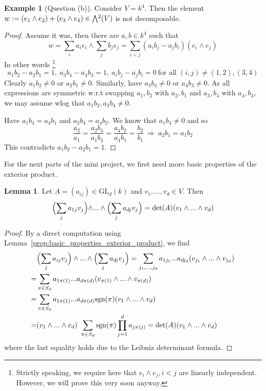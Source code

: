 \documentclass{scrartcl}
\newcommand{\GL}{\mathrm{GL}}
\newcommand{\sgn}{\mathrm{sgn}}
\newcommand{\extpow}{\mathchoice{{\textstyle\bigwedge}}
    {{\bigwedge}}
    {{\textstyle\wedge}}
    {{\scriptstyle\wedge}}}
\theoremstyle{definition}
\newtheorem{lemma}[subsection]{Lemma}
\newtheorem{example}[subsection]{Example}
\begin{document}
\begin{example}[Question (b)]
    Consider $V = k^4$. 
    Then the element $w := (e_1 \wedge e_2) + (e_3 \wedge e_4) \in \extpow^2(V)$ is not decomposable. 
\end{example}
\begin{proof}
    Assume it was, then there are $a, b \in k^4$ such that
    \begin{equation*}
        w = \sum_i a_i e_i \wedge \sum_j b_j e_j = \sum_{i < j} (a_i b_j - a_j b_i) (e_i \wedge e_j)
    \end{equation*}
    In other words
    \footnote{Strictly speaking, we require here that $e_i \wedge e_j, i < j$ are linearly independent. However, we will prove this very soon anyway.}
    \begin{equation*}
        a_1b_2 - a_2b_1 = 1, \ a_3b_4 - a_4b_3 = 1, \ a_i b_j - a_j b_i = 0 \ \text{for all $(i, j) \neq (1, 2), (3, 4)$}
    \end{equation*}
    Clearly $a_1 b_2 \neq 0$ or $a_2 b_1 \neq 0$.
    Similarly, have $a_3 b_4 \neq 0$ or $a_4 b_3 \neq 0$.
    As all expressions are symmetric w.r.t swapping $a_1, b_2$ with $a_2, b_1$ and $a_3, b_4$ with $a_4, b_3$, we may assume wlog that $a_1 b_2, a_3 b_4 \neq 0$.

    Have $a_1 b_4 = a_4 b_1$ and $a_2 b_4 = a_4 b_2$.
    We know that $a_1 b_4 \neq 0$ and so
    \begin{equation*}
        \frac {a_2} {a_1} = \frac {a_2 b_4} {a_1 b_4} = \frac {a_4 b_2} {a_4 b_1} = \frac {b_2} {b_1} \ \Rightarrow \ a_2 b_1 = a_1 b_2
    \end{equation*}
    This contradicts $a_1 b_2 - a_2 b_1 = 1$.
\end{proof}
For the next parts of the mini project, we first need more basic properties of the exterior product.
\begin{lemma}
    \label{prop:linear_transform_extpow}
    Let $A = (a_{ij}) \in \GL_d(k)$ and $v_1, ..., v_d \in V$.
    Then
    \begin{equation*}
        \Bigl( \sum_j a_{1j}v_j \Bigl) \wedge ... \wedge \Bigl( \sum_{j} a_{dj} v_j \Bigr) = \det(A) (v_1 \wedge ... \wedge v_d)
    \end{equation*}
\end{lemma}
\begin{proof}
    By a direct computation using Lemma~\ref{prop:basic_properties_exterior_product}, we find
    \begin{align*}
        &\Bigl( \sum_j a_{ij} v_j \Bigr) \wedge ... \wedge \Bigl( \sum_j a_{dj} v_j \Bigr) = \sum_{j_1, ..., j_d} a_{1j_1} ... a_{dj_d} (v_{j_1} \wedge ... \wedge v_{j_d}) \\
        = &\sum_{\pi \in S_d} a_{1\pi(1)} ... a_{d\pi(d)} (v_{\pi(1)} \wedge ... \wedge v_{\pi(d)}) \\
        = &\sum_{\pi \in S_d} a_{1\pi(1)} ... a_{d\pi(d)} \sgn(\pi) (v_1 \wedge ... \wedge v_d) \\
        = &(v_1 \wedge ... \wedge v_d) \ \sum_{\pi \in S_d} \sgn(\pi) \prod_{j = 1}^d a_{j\pi(j)} = \det(A) (v_1 \wedge ... \wedge v_d)
    \end{align*}
    where the last equality holds due to the Leibniz determinant formula.
\end{proof}
\end{document}

